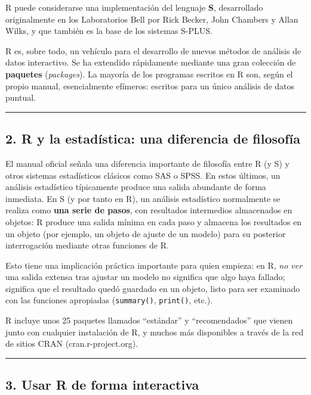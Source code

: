 \documentclass[
  jou,
  floatsintext,
  longtable,
  a4paper,
  nolmodern,
  notxfonts,
  notimes,
  12pt,
  colorlinks=true,linkcolor=blue,citecolor=blue,urlcolor=blue]{apa7}
\begin{document}
R puede considerarse una implementación del lenguaje \textbf{S},
desarrollado originalmente en los Laboratorios Bell por Rick Becker,
John Chambers y Allan Wilks, y que también es la base de los sistemas
S-PLUS.

R es, sobre todo, un vehículo para el desarrollo de nuevos métodos de
análisis de datos interactivo. Se ha extendido rápidamente mediante una
gran colección de \textbf{paquetes} (\emph{packages}). La mayoría de los
programas escritos en R son, según el propio manual, esencialmente
efímeros: escritos para un único análisis de datos puntual.

\begin{center}\rule{0.5\linewidth}{0.5pt}\end{center}

\subsection{2. R y la estadística: una diferencia de
filosofía}\label{r-y-la-estaduxedstica-una-diferencia-de-filosofuxeda}

El manual oficial señala una diferencia importante de filosofía entre R
(y S) y otros sistemas estadísticos clásicos como SAS o SPSS. En estos
últimos, un análisis estadístico típicamente produce una salida
abundante de forma inmediata. En S (y por tanto en R), un análisis
estadístico normalmente se realiza como \textbf{una serie de pasos}, con
resultados intermedios almacenados en objetos: R produce una salida
mínima en cada paso y almacena los resultados en un objeto (por ejemplo,
un objeto de ajuste de un modelo) para su posterior interrogación
mediante otras funciones de R.

Esto tiene una implicación práctica importante para quien empieza: en R,
\emph{no ver} una salida extensa tras ajustar un modelo no significa que
algo haya fallado; significa que el resultado quedó guardado en un
objeto, listo para ser examinado con las funciones apropiadas
(\texttt{summary()}, \texttt{print()}, etc.).

R incluye unos 25 paquetes llamados ``estándar'' y ``recomendados'' que
vienen junto con cualquier instalación de R, y muchos más disponibles a
través de la red de sitios CRAN (cran.r-project.org).

\begin{center}\rule{0.5\linewidth}{0.5pt}\end{center}

\subsection{3. Usar R de forma
interactiva}\label{usar-r-de-forma-interactiva}
\end{document}

